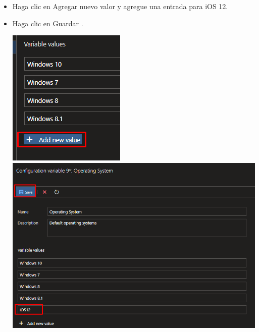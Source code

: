 \begin{itemize}
\item Haga clic en Agregar nuevo valor y agregue una entrada para iOS 12.
\item Haga clic en Guardar .
\begin{center}
\includegraphics[width=\columnwidth]{images/44}\newline
\includegraphics[width=\columnwidth]{images/45}\newline
\end{center}


\end{itemize}
